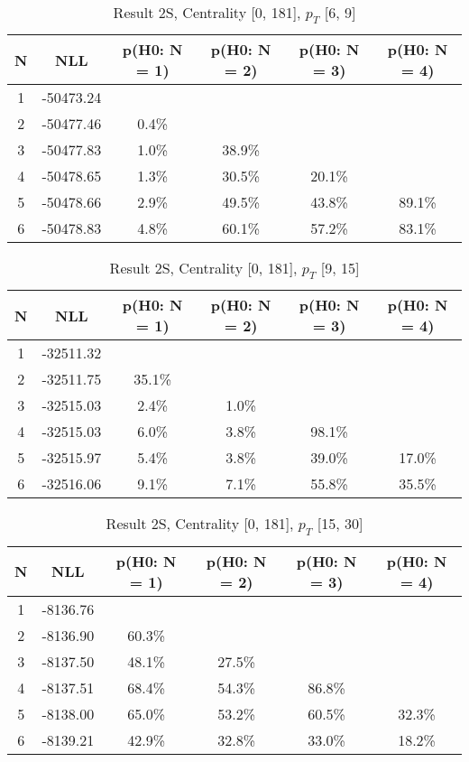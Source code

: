 \begin{table}[htb]
	\begin{center}
	\caption{Result 2S, Centrality [0, 181], $p_{T}$ [6, 9]
}
{\footnotesize\renewcommand{\arraystretch}{1.4}
		\begin{tabular}{cc||cccc}
			N & NLL & p(H0: N = 1) & p(H0: N = 2) & p(H0: N = 3) & p(H0: N = 4)\\ 
		\hline
1 & -50473.24 & & & & \\
2 & -50477.46 & 0.4\% & & & \\
3 & -50477.83 & 1.0\% & 38.9\% & & \\
4 & -50478.65 & 1.3\% & 30.5\% & 20.1\% & \\
5 & -50478.66 & 2.9\% & 49.5\% & 43.8\% & 89.1\% \\
6 & -50478.83 & 4.8\% & 60.1\% & 57.2\% & 83.1\% \\
	\end{tabular}
		\label{tab:lab}
	}
	\end{center}\end{table}

\begin{table}[htb]
	\begin{center}
	\caption{Result 2S, Centrality [0, 181], $p_{T}$ [9, 15]
}
{\footnotesize\renewcommand{\arraystretch}{1.4}
		\begin{tabular}{cc||cccc}
			N & NLL & p(H0: N = 1) & p(H0: N = 2) & p(H0: N = 3) & p(H0: N = 4)\\ 
		\hline
1 & -32511.32 & & & & \\
2 & -32511.75 & 35.1\% & & & \\
3 & -32515.03 & 2.4\% & 1.0\% & & \\
4 & -32515.03 & 6.0\% & 3.8\% & 98.1\% & \\
5 & -32515.97 & 5.4\% & 3.8\% & 39.0\% & 17.0\% \\
6 & -32516.06 & 9.1\% & 7.1\% & 55.8\% & 35.5\% \\
	\end{tabular}
		\label{tab:lab}
	}
	\end{center}\end{table}

\begin{table}[htb]
	\begin{center}
	\caption{Result 2S, Centrality [0, 181], $p_{T}$ [15, 30]
}
{\footnotesize\renewcommand{\arraystretch}{1.4}
		\begin{tabular}{cc||cccc}
			N & NLL & p(H0: N = 1) & p(H0: N = 2) & p(H0: N = 3) & p(H0: N = 4)\\ 
		\hline
1 & -8136.76 & & & & \\
2 & -8136.90 & 60.3\% & & & \\
3 & -8137.50 & 48.1\% & 27.5\% & & \\
4 & -8137.51 & 68.4\% & 54.3\% & 86.8\% & \\
5 & -8138.00 & 65.0\% & 53.2\% & 60.5\% & 32.3\% \\
6 & -8139.21 & 42.9\% & 32.8\% & 33.0\% & 18.2\% \\
	\end{tabular}
		\label{tab:lab}
	}
	\end{center}\end{table}


